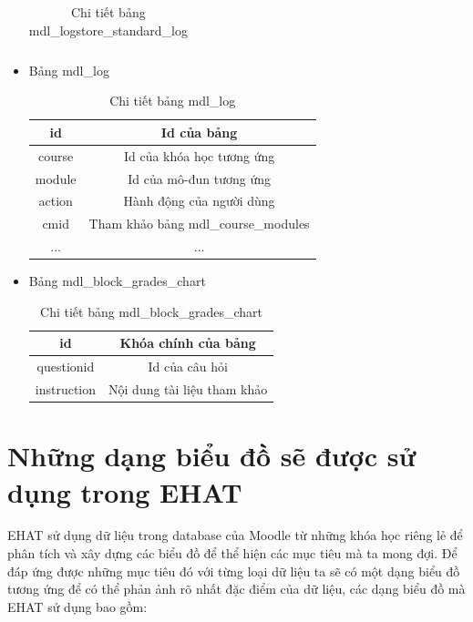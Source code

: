 \begin{itemize}
\begin{center}
\begin{table}[!htp]
\begin{tabular}{|c|c|}
				\hline 
			\end{tabular} 
			\caption{Chi tiết bảng mdl\_logstore\_standard\_log}
			\label{bang17}
		\end{table}
	\end{center}
	\item Bảng mdl\_log
	\begin{center}
		\begin{table}[!htp]
			\centering
			\begin{tabular}{|c|c|}
				\hline 
				id & Id của bảng \\ 
				\hline 
				course & Id của khóa học tương ứng \\ 
				\hline
				module & Id của mô-đun tương ứng \\
				\hline
				action & Hành động của người dùng \\
				\hline 
				cmid & Tham khảo bảng mdl\_course\_modules \\
				\hline
				... & ... \\ 
				\hline 
			\end{tabular} 
			\caption{Chi tiết bảng mdl\_log}
			\label{bang18}
		\end{table}
	\end{center}
	
	\item Bảng mdl\_block\_grades\_chart
	\begin{center}
		\begin{table}[!htp]
			\centering
			\begin{tabular}{|c|c|}
				\hline 
				id & Khóa chính của bảng \\ 
				\hline 
				questionid & Id của câu hỏi \\ 
				\hline
				instruction & Nội dung tài liệu tham khảo \\
				\hline 
			\end{tabular} 
			\caption{Chi tiết bảng mdl\_block\_grades\_chart}
			\label{bang19}
		\end{table}
	\end{center}
\end{itemize}

\newpage
\section{Những dạng biểu đồ sẽ được sử dụng trong EHAT}
EHAT sử dụng dữ liệu trong database của Moodle từ những khóa học riêng lẻ để phân tích và xây dựng các biểu đồ để thể hiện các mục tiêu mà ta mong đợi. Để đáp ứng được những mục tiêu đó với từng loại dữ liệu ta sẽ có một dạng biểu đồ tương ứng để có thể phản ảnh rõ nhất đặc điểm của dữ liệu, các dạng biểu đồ mà EHAT sử dụng bao gồm:

